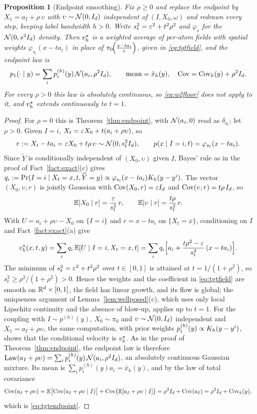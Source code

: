 \documentclass{article} %
\theoremstyle{plain}
\newtheorem{proposition}[theorem]{Proposition}
\theoremstyle{definition}
\theoremstyle{remark}
\begin{document}
\begin{proposition}[Endpoint smoothing]
\label{prop:tgtnoise}
Fix $\rho\ge0$ and replace the endpoint by $X_1=a_I+\rho\,\upsilon$ with $\upsilon\sim\mathcal{N}(0,I_d)$ independent
of $(I,X_0,\omega)$ and redrawn every step, keeping label bandwidth $h>0$. Write
$s_t^2=\varepsilon^2+t^2\rho^2$ and $\varphi_s$ for the $\mathcal{N}(0,s^2I_d)$ density. Then $v_h^\star$ is a
weighted average of per-atom fields with spatial weights $\varphi_{s_t}(x-ta_i)$ in place of
$\pi_0\!\Big(\frac{x-ta_{i}}{\varepsilon}\Big)$, given in \eqref{eq:tgtfield}, and the endpoint law is
\begin{equation}
p_1(\cdot\mid y)=\sum_i p_i^{(h)}(y)\,\mathcal{N}(a_i,\rho^2I_d),
\qquad
\text{mean}=\bar x_h(y),\quad \operatorname{Cov}=\operatorname{Cov}_h(y)+\rho^2I_d.
\label{eq:tgtendpoint}
\end{equation}
For every $\rho>0$ this law is absolutely continuous, so \eqref{eq:w2floor} does not apply to it,
and $v_h^\star$ extends continuously to $t=1$.
\end{proposition}

\begin{proof}
\label{apx:pf-tgtnoise}
For $\rho=0$ this is Theorem~\ref{thm:endpoint}, with $\mathcal{N}(a_i,0)$ read as $\delta_{a_i}$; let
$\rho>0$. Given $I=i$, $X_t=\varepsilon X_0+t(a_i+\rho\upsilon)$, so
\[
r:=X_t-ta_i=\varepsilon X_0+t\rho\,\upsilon\sim\mathcal{N}(0,s_t^2I_d),\qquad p(x\mid I=i,t)=\varphi_{s_t}(x-ta_i).
\]
Since $\widetilde Y$ is conditionally independent of $(X_0,\upsilon)$ given $I$, Bayes' rule as in the
proof of Fact~\ref{fact:exact}(c) gives
$q_i:=\Pr(I=i\mid X_t=x,t,\widetilde Y=y)\propto\varphi_{s_t}(x-ta_i)K_h(y-y^{i})$. The vector
$(X_0,\upsilon,r)$ is jointly Gaussian with $\operatorname{Cov}(X_0,r)=\varepsilon I_d$ and $\operatorname{Cov}(\upsilon,r)=t\rho\,I_d$, so
\[
\mathbb{E}[X_0\mid r]=\frac{\varepsilon}{s_t^2}\,r,\qquad \mathbb{E}[\upsilon\mid r]=\frac{t\rho}{s_t^2}\,r .
\]
With $U=a_i+\rho\upsilon-X_0$ on $\{I=i\}$ and $r=x-ta_i$ on $\{X_t=x\}$, conditioning on $I$ and
Fact~\ref{fact:exact}(a) give
\begin{equation}
v_h^\star(x,t,y)=\sum_iq_i\,\mathbb{E}[U\mid I=i,X_t=x,t]
=\sum_iq_i\Big[a_i+\frac{t\rho^2-\varepsilon}{s_t^2}\,(x-ta_i)\Big].
\label{eq:tgtfield}
\end{equation}
The minimum of $s_t^2=\varepsilon^2+t^2\rho^2$ over $t\in[0,1]$ is attained at $t=1/(1+\rho^2)$, so
$s_t^2\ge\rho^2/(1+\rho^2)>0$. Hence the weights and the coefficient in \eqref{eq:tgtfield} are
smooth on $\mathbb{R}^d\times[0,1]$, the field has linear growth, and its flow is global; the uniqueness
argument of Lemma~\ref{lem:wellposed}(c), which uses only local Lipschitz continuity and the absence
of blow-up, applies up to $t=1$. For the coupling with $I\sim p^{(h)}(y)$, $X_0\sim\pi_0$ and
$\upsilon\sim\mathcal{N}(0,I_d)$ independent and $X_1=a_I+\rho\upsilon$, the same computation, with prior weights
$p^{(h)}_i(y)\propto K_h(y-y^{i})$, shows that the conditional velocity is $v_h^\star$. As in the proof of
Theorem~\ref{thm:endpoint}, the endpoint law is therefore $\mathrm{Law}(a_I+\rho\upsilon)=\sum_ip_i^{(h)}(y)\,
\mathcal{N}(a_i,\rho^2I_d)$, an absolutely continuous Gaussian mixture. Its mean is
$\sum_ip_i^{(h)}(y)a_i=\bar x_h(y)$, and by the law of total covariance
\[
\operatorname{Cov}(a_I+\rho\upsilon)=\mathbb{E}\bigl[\operatorname{Cov}(a_I+\rho\upsilon\mid I)\bigr]+\operatorname{Cov}\bigl(\mathbb{E}[a_I+\rho\upsilon\mid I]\bigr)
=\rho^2I_d+\operatorname{Cov}(a_I)=\rho^2I_d+\operatorname{Cov}_h(y),
\]
which is \eqref{eq:tgtendpoint}.
\end{proof}
\end{document}

